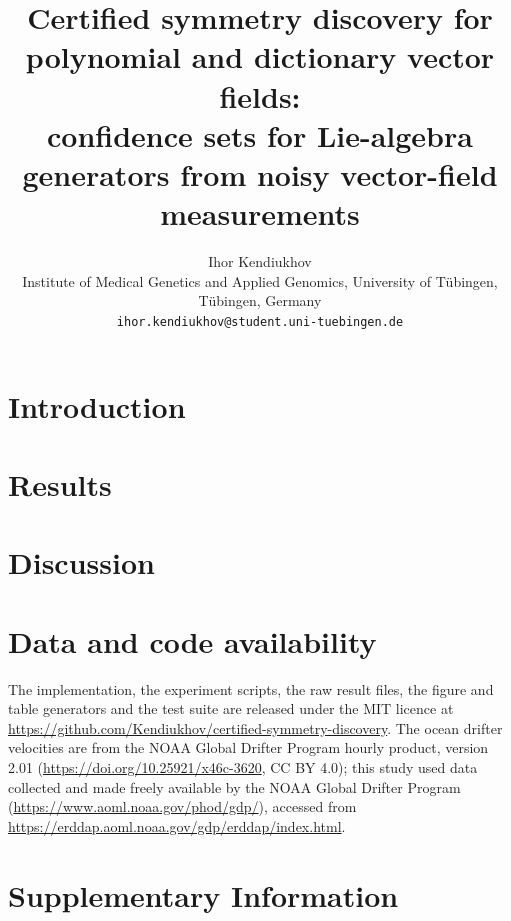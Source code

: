 \documentclass[11pt]{article}
\title{\bf Certified symmetry discovery for polynomial and dictionary vector
fields:\\ confidence sets for Lie-algebra generators from noisy vector-field
measurements}
\author{Ihor Kendiukhov\\[2pt]
{\normalsize Institute of Medical Genetics and Applied Genomics, University of T\"ubingen, T\"ubingen, Germany}\\
{\normalsize \texttt{ihor.kendiukhov@student.uni-tuebingen.de}}}
\date{}
\theoremstyle{definition}
\begin{document}
\maketitle

\begin{abstract}

\end{abstract}

\section{Introduction}


\section{Results}






\FloatBarrier
\section{Discussion}




\section*{Data and code availability}
The implementation, the experiment scripts, the raw result files, the figure
and table generators and the test suite are released under the MIT licence at
\url{https://github.com/Kendiukhov/certified-symmetry-discovery}. The ocean
drifter velocities are from the NOAA Global Drifter Program hourly product,
version 2.01 (\url{https://doi.org/10.25921/x46c-3620}, CC BY 4.0); this study
used data collected and made freely available by the NOAA Global Drifter
Program (\url{https://www.aoml.noaa.gov/phod/gdp/}), accessed from
\url{https://erddap.aoml.noaa.gov/gdp/erddap/index.html}.




\clearpage
\appendix
\renewcommand{\thefigure}{S\arabic{figure}}
\renewcommand{\thetable}{S\arabic{table}}
\setcounter{figure}{0}
\setcounter{table}{0}
\section*{Supplementary Information}

\end{document}
